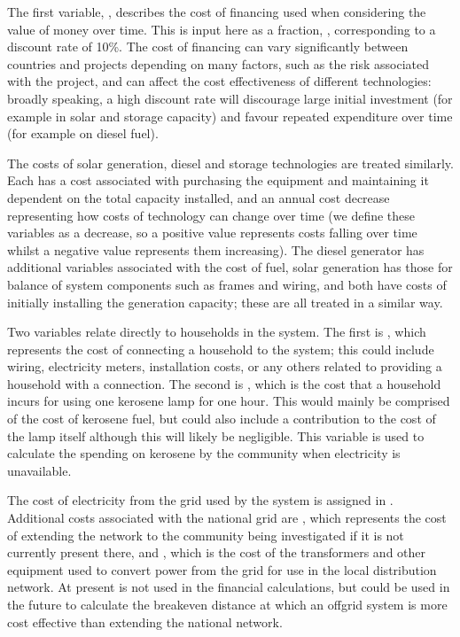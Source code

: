 \documentclass[letterpaper,10pt,english]{sphinxmanual}
\begin{document}
\sphinxAtStartPar
The first variable, , describes the cost of financing
used when considering the value of money over time. This is input here
as a fraction, , corresponding to a discount rate of 10\%. The
cost of financing can vary significantly between countries and projects
depending on many factors, such as the risk associated with the project,
and can affect the cost effectiveness of different technologies: broadly
speaking, a high discount rate will discourage large initial investment
(for example in solar and storage capacity) and favour repeated
expenditure over time (for example on diesel fuel).

\sphinxAtStartPar
The costs of solar generation, diesel and storage technologies are
treated similarly. Each has a cost associated with purchasing the
equipment and maintaining it dependent on the total capacity installed,
and an annual cost decrease representing how costs of technology can
change over time (we define these variables as a decrease, so a positive
value represents costs falling over time whilst a negative value
represents them increasing). The diesel generator has additional
variables associated with the cost of fuel, solar generation has those
for balance of system components such as frames and wiring, and both
have costs of initially installing the generation capacity; these are
all treated in a similar way.

\sphinxAtStartPar
Two variables relate directly to households in the system. The first is
, which represents the cost of connecting a household
to the system; this could include wiring, electricity meters,
installation costs, or any others related to providing a household with
a connection. The second is , which is the cost that a
household incurs for using one kerosene lamp for one hour. This would
mainly be comprised of the cost of kerosene fuel, but could also include
a contribution to the cost of the lamp itself although this will likely
be negligible. This variable is used to calculate the spending on
kerosene by the community when electricity is unavailable.

\sphinxAtStartPar
The cost of electricity from the grid used by the system is assigned in
. Additional costs associated with the national grid are
, which represents the cost of extending the
network to the community being investigated if it is not currently
present there, and , which is the cost of
the transformers and other equipment used to convert power from the grid
for use in the local distribution network. At present
 is not used in the financial calculations, but
could be used in the future to calculate the breakeven distance at which
an off\sphinxhyphen{}grid system is more cost effective than extending the national
network.
\end{document}
